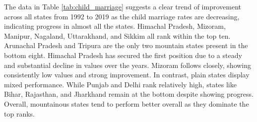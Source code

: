 The data in Table \ref{tab:child_marriage} suggests a clear trend of improvement across all states from 1992 to 2019 as the child marriage rates are decreasing, indicating progress in almost all the states. Himachal Pradesh, Mizoram, Manipur, Nagaland, Uttarakhand, and Sikkim all rank within the top ten. Arunachal Pradesh and Tripura are the only two mountain states present in the bottom eight. Himachal Pradesh has secured the first position due to a steady and substantial decline in values over the years. Mizoram follows closely, showing consistently low values and strong improvement. In contrast, plain states display mixed performance. While Punjab and Delhi rank relatively high, states like Bihar, Rajasthan, and Jharkhand remain at the bottom despite showing progress. Overall, mountainous states tend to perform better overall as they dominate the top ranks.

